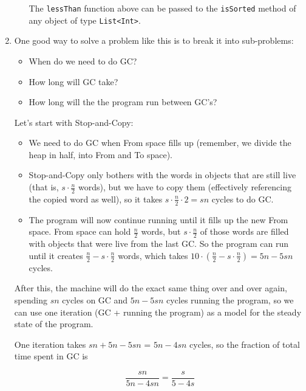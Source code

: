 \documentclass{article}
\begin{document}
\begin{enumerate}
\begin{enumerate}
The \texttt{lessThan} function above can be passed to the
\texttt{isSorted} method of any object of type \texttt{List<Int>}.

\end{enumerate}

\medskip

\item

One good way to solve a problem like this is to break it into sub-problems:

\begin{itemize}
\item When do we need to do GC?
\item How long will GC take?
\item How long will the the program run between GC's?
\end{itemize}

Let's start with Stop-and-Copy:

\begin{itemize}

\item We need to do GC when From space fills up (remember, we divide the
heap in half, into From and To space).

\item Stop-and-Copy only bothers with the words in objects that are still
live (that is, $s \cdot \frac{n}{2}$ words), but we have to copy them
(effectively referencing the copied word as well), so it takes $s \cdot
\frac{n}{2} \cdot 2 = sn$ cycles to do GC.

\item The program will now continue running until it fills up the new From
space. From space can hold $\frac{n}{2}$ words, but $s \cdot \frac{n}{2}$
of those words are filled with objects that were live from the last GC. So
the program can run until it creates $\frac{n}{2} - s \cdot \frac{n}{2}$
words, which takes $10 \cdot (\frac{n}{2} - s \cdot \frac{n}{2}) = 5n -
5sn$ cycles.

\end{itemize}

After this, the machine will do the exact same thing over and over again,
spending $sn$ cycles on GC and $5n - 5sn$ cycles running the program, so
we can use one iteration (GC + running the program) as a model for the
steady state of the program.

One iteration takes $sn + 5n - 5sn$ = $5n - 4sn$ cycles, so the fraction
of total time spent in GC is

$$
\frac{sn}{5n - 4sn} = \frac{s}{5 - 4s}
$$


\end{enumerate}
\end{document}
